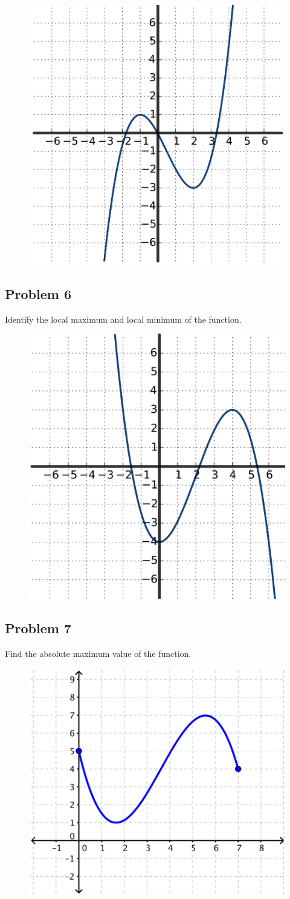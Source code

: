 \documentclass[12pt]{article}
\begin{document}
\begin{figure}[!ht]
    \centering
    \includegraphics[width=0.5\linewidth]{3.png}
\end{figure}

\subsection*{Problem 6}
Identify the local maximum and local minimum of the function.
\begin{figure}[!ht]
    \centering
    \includegraphics[width=0.5\linewidth]{4.png}
\end{figure}

\subsection*{Problem 7}
Find the absolute maximum value of the function.
\begin{figure}[!ht]
    \centering
    \includegraphics[width=0.5\linewidth]{5.png}
\end{figure}
\end{document}
